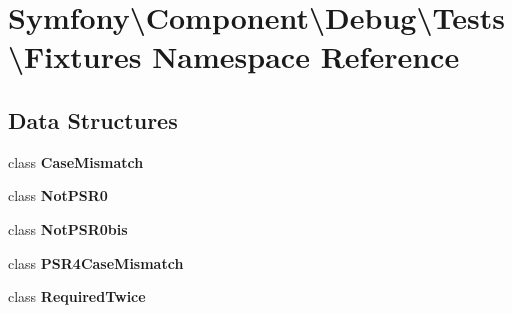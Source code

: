 \section{Symfony\textbackslash{}Component\textbackslash{}Debug\textbackslash{}Tests\textbackslash{}Fixtures Namespace Reference}
\label{namespace_symfony_1_1_component_1_1_debug_1_1_tests_1_1_fixtures}
\subsection*{Data Structures}
\begin{DoxyCompactItemize}
\item 
class {\bf Case\+Mismatch}
\item 
class {\bf Not\+P\+S\+R0}
\item 
class {\bf Not\+P\+S\+R0bis}
\item 
class {\bf P\+S\+R4\+Case\+Mismatch}
\item 
class {\bf Required\+Twice}
\end{DoxyCompactItemize}
